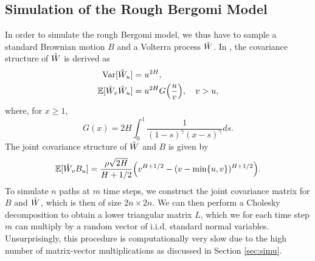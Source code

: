 \subsection{Simulation of the Rough Bergomi Model}
In order to simulate the rough Bergomi model, we thus have to sample a standard Brownian motion $B$ and a Volterra process $\Tilde{W}$. In \cite{pricing}, the covariance structure of $\Tilde{W}$ is derived as 
\begin{align}
    \textrm{Var}[\Tilde{W}_{u}]&= u^{2H},\\
    \E[\Tilde{W}_{v}\Tilde{W}_{u}]&=u^{2H}G\left(\frac{u}{v}\right),\quad v>u,
\end{align}
where, for $x\geq 1$,
\begin{equation}
    G(x)=2H\int_{0}^{1}\frac{1}{(1-s)^{\gamma}(x-s)^{\gamma}}ds.
\end{equation}
The joint covariance structure of $\Tilde{W}$ and $B$ is given by
\begin{equation}
    \E[\Tilde{W}_{v}B_{u}]=\frac{\rho\sqrt{2H}}{H+1/2}\left(v^{H+1/2}-(v-\min\{u,v\})^{H+1/2}\right).
\end{equation}
To simulate $n$ paths at $m$ time steps, we construct the joint covariance matrix for $B$ and $\Tilde{W}$, which is then of size $2n\times 2n$. We can then perform a Cholesky decomposition to obtain a lower triangular matrix $L$, which we for each time step $m$ can multiply by a random vector of i.i.d. standard normal variables. Unsurprisingly, this procedure is computationally very slow due to the high number of matrix-vector multiplications as discussed in Section \ref{sec:simu}.

